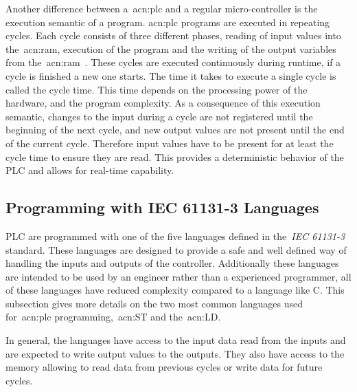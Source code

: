 Another difference between a~\acrshort{acn:plc} and a regular micro-controller is the execution semantic of a program.
\acrshort{acn:plc} programs are executed in repeating cycles.
Each cycle consists of three different phases, reading of input values into the~\acrshort{acn:ram}, execution of the program and the writing of the output variables from the~\acrshort{acn:ram}~\cite[p.~75]{BOLTON200653}.
These cycles are executed continuously during runtime, if a cycle is finished a new one starts.
The time it takes to execute a single cycle is called the cycle time.
This time depends on the processing power of the hardware, and the program complexity.
As a consequence of this execution semantic, changes to the input during a cycle are not registered until the beginning of the next cycle, and new output values are not present until the end of the current cycle.
Therefore input values have to be present for at least the cycle time to ensure they are read.
This provides a deterministic behavior of the PLC and allows for real-time capability.

\subsection{Programming with IEC 61131-3 Languages}

PLC are programmed with one of the five languages defined in the~\textit{IEC 61131-3}~\cite{Plcopen:61131-3} standard.
These languages are designed to provide a safe and well defined way of handling the inputs and outputs of the controller.
Additionally these languages are intended to be used by an engineer rather than a experienced programmer, all of these languages have reduced complexity compared to a language like C.
This subsection gives more details on the two most common languages used for~\acrshort{acn:plc} programming,~\acrfull{acn:ST} and the~\acrfull{acn:LD}.

In general, the languages have access to the input data read from the inputs and are expected to write output values to the outputs.
They also have access to the memory allowing to read data from previous cycles or write data for future cycles.

